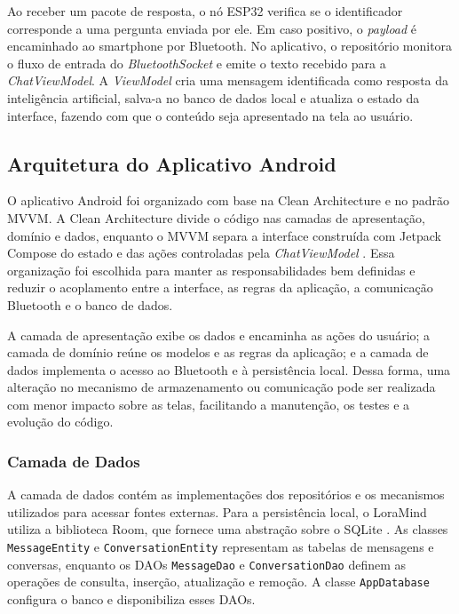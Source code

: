\documentclass[12pt]{article}
\begin{document}
Ao receber um pacote de resposta, o nó ESP32 verifica se o identificador corresponde a uma pergunta enviada por ele. Em caso positivo, o \textit{payload} é encaminhado ao smartphone por Bluetooth. No aplicativo, o repositório monitora o fluxo de entrada do \textit{BluetoothSocket} e emite o texto recebido para a \textit{ChatViewModel}. A \textit{ViewModel} cria uma mensagem identificada como resposta da inteligência artificial, salva-a no banco de dados local e atualiza o estado da interface, fazendo com que o conteúdo seja apresentado na tela ao usuário.

\subsection{Arquitetura do Aplicativo Android}
\label{subsec:arquitetura-aplicativo}

O aplicativo Android foi organizado com base na Clean Architecture e no padrão MVVM. A Clean Architecture divide o código nas camadas de apresentação, domínio e dados, enquanto o MVVM separa a interface construída com Jetpack Compose do estado e das ações controladas pela \textit{ChatViewModel} \cite{androidarchitecture2026}. Essa organização foi escolhida para manter as responsabilidades bem definidas e reduzir o acoplamento entre a interface, as regras da aplicação, a comunicação Bluetooth e o banco de dados.

A camada de apresentação exibe os dados e encaminha as ações do usuário; a camada de domínio reúne os modelos e as regras da aplicação; e a camada de dados implementa o acesso ao Bluetooth e à persistência local. Dessa forma, uma alteração no mecanismo de armazenamento ou comunicação pode ser realizada com menor impacto sobre as telas, facilitando a manutenção, os testes e a evolução do código.

\subsubsection{Camada de Dados}

A camada de dados contém as implementações dos repositórios e os mecanismos utilizados para acessar fontes externas. Para a persistência local, o LoraMind utiliza a biblioteca Room, que fornece uma abstração sobre o SQLite \cite{androidroom2026}. As classes \texttt{MessageEntity} e \texttt{ConversationEntity} representam as tabelas de mensagens e conversas, enquanto os DAOs \texttt{MessageDao} e \texttt{ConversationDao} definem as operações de consulta, inserção, atualização e remoção. A classe \texttt{AppDatabase} configura o banco e disponibiliza esses DAOs.
\end{document}
